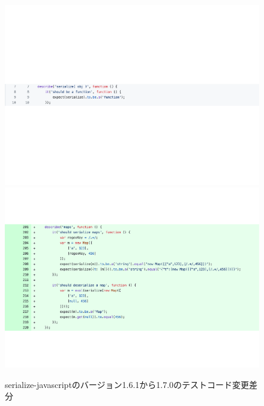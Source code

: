 \documentclass[11pt,dvipdfmx]{jreport}
\begin{document}
\begin{figure}[t]
  \centering
  \includegraphics[width=1.0\linewidth]{fig/rq1/set-map/map.test.1.pdf}
  \includegraphics[width=1.0\linewidth]{fig/rq1/set-map/map.test.2.pdf}
  \caption{serialize-javascriptのバージョン1.6.1から1.7.0のテストコード変更差分}
  \label{fig:rq1.insert-test-test}
\end{figure}
\end{document}
